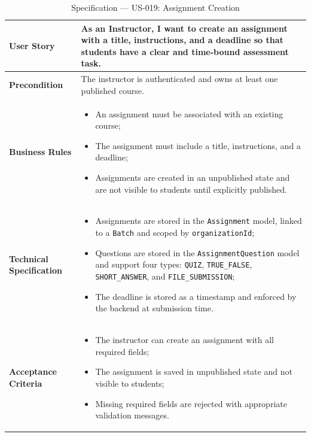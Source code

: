 \begin{table}[H]
\centering
\caption{Specification — US-019: Assignment Creation}
\label{tab:us019}
\renewcommand{\arraystretch}{1.2}
\begin{tabularx}{\textwidth}{|p{3.5cm}|X|}
\hline
\textbf{User Story} & As an Instructor, I want to create an assignment with a title, instructions, and a deadline so that students have a clear and time-bound assessment task. \\
\hline
\textbf{Precondition} & The instructor is authenticated and owns at least one published course. \\
\hline
\textbf{Business Rules} &
\begin{itemize}[noitemsep, topsep=2pt]
  \item An assignment must be associated with an existing course;
  \item The assignment must include a title, instructions, and a deadline;
  \item Assignments are created in an unpublished state and are not visible to students until explicitly published.
\end{itemize} \\
\hline
\textbf{Technical Specification} &
\begin{itemize}[noitemsep, topsep=2pt]
  \item Assignments are stored in the \texttt{Assignment} model, linked to a \texttt{Batch} and scoped by \texttt{organizationId};
  \item Questions are stored in the \texttt{AssignmentQuestion} model and support four types: \texttt{QUIZ}, \texttt{TRUE\_FALSE}, \texttt{SHORT\_ANSWER}, and \texttt{FILE\_SUBMISSION};
  \item The deadline is stored as a timestamp and enforced by the backend at submission time.
\end{itemize} \\
\hline
\textbf{Acceptance Criteria} &
\begin{itemize}[noitemsep, topsep=2pt]
  \item The instructor can create an assignment with all required fields;
  \item The assignment is saved in unpublished state and not visible to students;
  \item Missing required fields are rejected with appropriate validation messages.
\end{itemize} \\
\hline
\end{tabularx}
\end{table}

